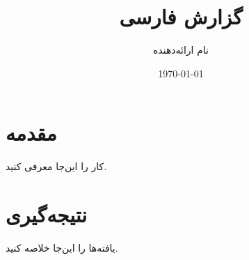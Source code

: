 \documentclass[12pt]{report}
\title{گزارش فارسی}
\author{نام ارائه‌دهنده}
\date{\today}
\begin{document}
\maketitle
\tableofcontents

\chapter{مقدمه}
کار را این‌جا معرفی کنید.

\chapter{نتیجه‌گیری}
یافته‌ها را این‌جا خلاصه کنید.

% 
\end{document}
